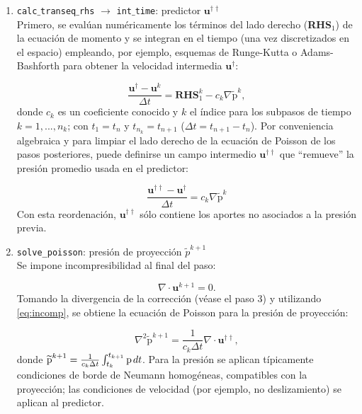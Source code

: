 \begin{enumerate}

	\item \texttt{calc$\_$transeq$\_$rhs} $\rightarrow$ \texttt{int$\_$time}: predictor $\mathbf{u}^{\dagger \dagger}$ \\
	 Primero, se evalúan numéricamente los términos del lado derecho (\textbf{RHS}$_1$) de la ecuación de momento y se integran en el tiempo (una vez discretizados en el espacio) empleando, por ejemplo, esquemas de Runge-Kutta o Adams-Bashforth para obtener la velocidad intermedia $\mathbf{u}^{\dagger}$:

\begin{equation}
\frac{\mathbf{u}^{\dagger} - \mathbf{u}^k}{\Delta t} = \textbf{RHS}_1^k - c_k \nabla \widetilde{\text{p}}^k , 
\end{equation}
donde $c_k$ es un coeficiente conocido y $k$ el índice para los subpasos de tiempo \linebreak $k=1,...,n_k$; con $t_1=t_n$ y $t_{n_k}=t_{n+1}$ ($\Delta t = t_{n+1} - t_{n}$). Por conveniencia algebraica y para limpiar el lado derecho de la ecuación de Poisson de los pasos posteriores, puede definirse un 
campo intermedio $\mathbf{u}^{\dagger \dagger}$ que ``remueve'' la presión promedio usada en el
predictor:

\begin{equation}
\frac{\mathbf{u}^{\dagger \dagger} - \mathbf{u}^{\dagger}}{\Delta t} = c_k \nabla \widetilde{\text{p}}^k  
\end{equation}
Con esta reordenación, $\mathbf{u}^{\dagger \dagger}$ sólo contiene los aportes no asociados a la presión previa.

	\item \texttt{solve\_poisson}: presión de proyección $\widetilde{p}^{k+1}$ \\
	Se impone incompresibilidad al final del paso:
	
\begin{equation}
\nabla \cdot \mathbf{u}^{k+1} = 0.
\label{eq:incomp}
\end{equation}
Tomando la divergencia de la corrección (véase el paso 3) y utilizando \ref{eq:incomp}, se obtiene la ecuación de Poisson para la presión de proyección:

\begin{equation}
\nabla^2 \widetilde{\text{p}}^{k+1} = \frac{1}{c_k \Delta t} \nabla \cdot \mathbf{u}^{\dagger \dagger},
\end{equation}
donde $\widetilde{\text{p}}^{k+1}= \frac{1}{c_k \Delta t} \int^{t_{k+1}}_{t_k} \text{p} \hspace{0.5mm} dt$. Para la presión se aplican típicamente condiciones de borde de Neumann homogéneas, compatibles con la proyección; las condiciones de velocidad (por ejemplo, no deslizamiento) se aplican al predictor.


\end{enumerate}
